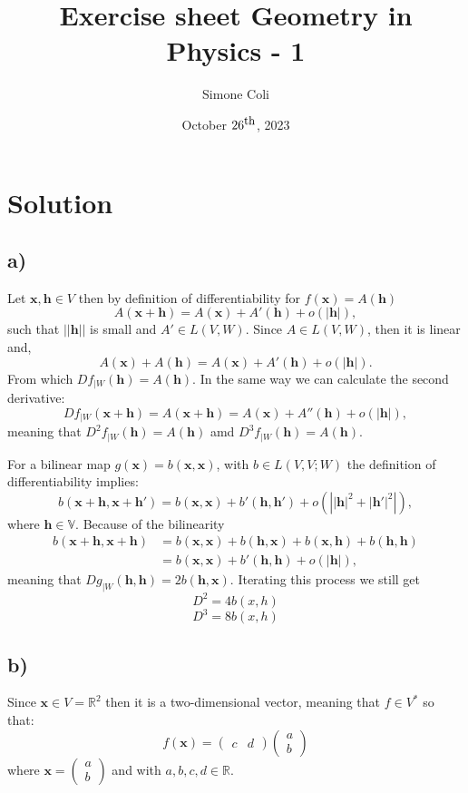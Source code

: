 \documentclass{article}[a4paper]
\title{Exercise sheet Geometry in Physics - 1}
\author{Simone Coli}
\date{October $26^{\mbox{\small th}}$, 2023}
\begin{document}
\maketitle
\section{Solution} %
    \subsection*{a)}
        Let $\mathbf{x, h} \in V$ then by definition of differentiability for $f(\mathbf{x}) = A(\mathbf{h})$
        \[
            A(\mathbf{x + h}) = A(\mathbf{x}) + A'(\mathbf{h}) + o(|\mathbf{h}|),
        \]
        such that $||\mathbf{h}||$ is small and $A' \in L(V, W)$. Since $A \in L(V, W)$, then it is linear and,
        \[
            A(\mathbf{x}) + A(\mathbf{h}) = A(\mathbf{x}) + A'(\mathbf{h}) + o(|\mathbf{h}|).
        \]
        From which $Df_{|W}(\mathbf{h}) = A(\mathbf{h})$. In the same way we can calculate the second derivative:
        \[
            Df_{|W}(\mathbf{x+h}) = A(\mathbf{x + h}) = A(\mathbf{x}) + A''(\mathbf{h}) + o(|\mathbf{h}|),
        \]
        meaning that $D^2f_{|W}(\mathbf{h}) = A(\mathbf{h})$ amd $D^3f_{|W}(\mathbf{h}) = A(\mathbf{h})$.

        For a bilinear map $g(\mathbf{x}) = b(\mathbf{x,x})$, with $b \in L(V,V;W)$ the definition of differentiability implies:
        \[
            b(\mathbf{x+h,x+h'}) = b(\mathbf{x,x}) + b'(\mathbf{h,h'}) + o(|{|\mathbf{h}|}^2+{|\mathbf{h'}|}^2|),
        \]
        where $\mathbf{h} \in \mathbb{V}$. Because of the bilinearity
        \[
            \begin{split}
                b(\mathbf{x+h,x+h}) &= b(\mathbf{x,x}) + b(\mathbf{h,x}) + b(\mathbf{x,h}) + b(\mathbf{h,h}) \\
                &= b(\mathbf{x,x}) + b'(\mathbf{h,h}) + o(|\mathbf{h}|),
            \end{split}
        \]
        meaning that $Dg_{|W}(\mathbf{h,h}) = 2b(\mathbf{h,x})$.
        Iterating this process we still get
        \[
            D^2 = 4b(x, h)
        \]
        \[
            D^3 = 8b(x, h)
        \]
    \subsection*{b)}
    Since $\mathbf{x} \in V= \mathbb{R}^2$ then it is a two-dimensional vector, meaning that $f \in V^*$ so that:
    \[
        f(\mathbf{x}) = 
        \begin{pmatrix}
             c & d
        \end{pmatrix}
        \begin{pmatrix}
            a\\
            b
        \end{pmatrix}
    \]
    where $\mathbf{x}=
    \begin{pmatrix}
        a\\
        b
    \end{pmatrix}$
   and with $a,b,c,d \in \mathbb{R}$.
\end{document}
